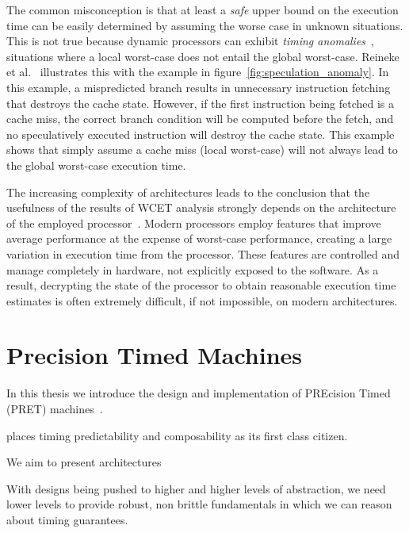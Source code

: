 The common misconception is that at least a \emph{safe} upper bound on the execution time can be easily determined by assuming the worse case in unknown situations.
This is not true because dynamic processors can exhibit \emph{timing anomalies}~\cite{Reineke06adefinition,Lundqvist1999}, situations where a local worst-case does not entail the global worst-case.
Reineke et al.~\cite{Reineke06adefinition} illustrates this with the example in figure~\ref{fig:speculation_anomaly}.
In this example, a mispredicted branch results in unnecessary instruction fetching that destroys the cache state. 
However, if the first instruction being fetched is a cache miss, the correct branch condition will be computed before the fetch, and no speculatively executed instruction will destroy the cache state. 
This example shows that simply assume a cache miss (local worst-case) will not always lead to the global worst-case execution time.    

The increasing complexity of architectures leads to the conclusion that the usefulness of the results of WCET analysis strongly depends on the architecture of the employed processor~\cite{Heckmann2003processor}.
Modern processors employ features that improve average performance at the expense of worst-case performance, creating a large variation in execution time from the processor. 
These features are controlled and manage completely in hardware, not explicitly exposed to the software.
As a result, decrypting the state of the processor to obtain reasonable execution time estimates is often extremely difficult, if not impossible, on modern architectures.   

\section{Precision Timed Machines}
In this thesis we introduce the design and implementation of PREcision Timed (PRET) machines~\cite{Edwards2007PRETcase}. 

places timing predictability and composability as its first class citizen.   

We aim to present architectures

With designs being pushed to higher and higher levels of abstraction, we need lower levels to provide robust, non brittle fundamentals in which we can reason about timing guarantees.


